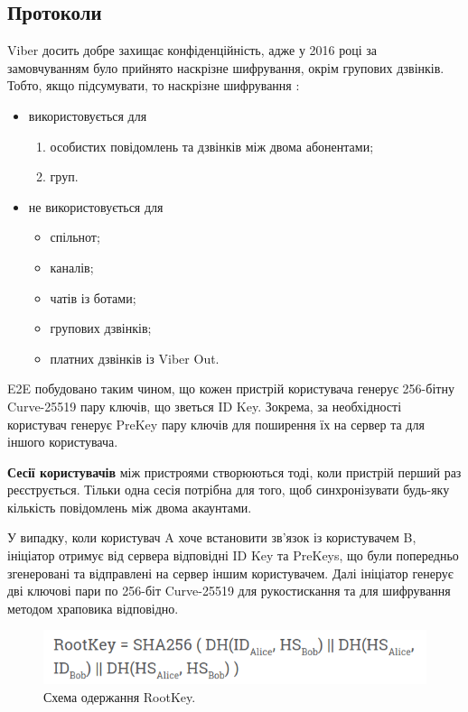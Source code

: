 \subsection{Протоколи}
Viber досить добре захищає конфіденційність, адже у 2016 році за замовчуванням було прийнято наскрізне шифрування, окрім групових дзвінків. Тобто, якщо підсумувати, то наскрізне шифрування \cite{viber_end_to_end_encryption}:
\begin{itemize}
    \item використовується для
    \begin{enumerate}
        \item особистих повідомлень та дзвінків між двома абонентами;
        \item груп.
    \end{enumerate}
    
    \item не використовується для
    \begin{itemize}
        \item спільнот;
        \item каналів;
        \item чатів із ботами;
        \item групових дзвінків;
        \item платних дзвінків із Viber Out.
    \end{itemize}
\end{itemize}

E2E побудовано таким чином, що кожен пристрій користувача генерує 256-бітну Curve-25519 пару ключів, що зветься ID Key. Зокрема, за необхідності користувач генерує PreKey пару ключів для поширення їх на сервер та для іншого користувача.

\textbf{Сесії користувачів} між пристроями створюються тоді, коли пристрій перший раз реєструється. Тільки одна сесія потрібна для того, щоб синхронізувати будь-яку кількість повідомлень між двома акаунтами. 

У випадку, коли користувач A хоче встановити зв'язок із користувачем B, ініціатор отримує від сервера відповідні ID Key та PreKeys, що були попередньо згенеровані та відправлені на сервер іншим користувачем. Далі ініціатор генерує дві ключові пари по 256-біт Curve-25519 для рукостискання та для шифрування методом храповика відповідно. 


\begin{figure}[ht!]
        \centering
        \includegraphics[scale=0.37]{../IMAGES/viber_1_root_key_deriving.png}
        \caption{Схема одержання RootKey.}
        \label{viber_1_root_key_deriving}
\end{figure}


